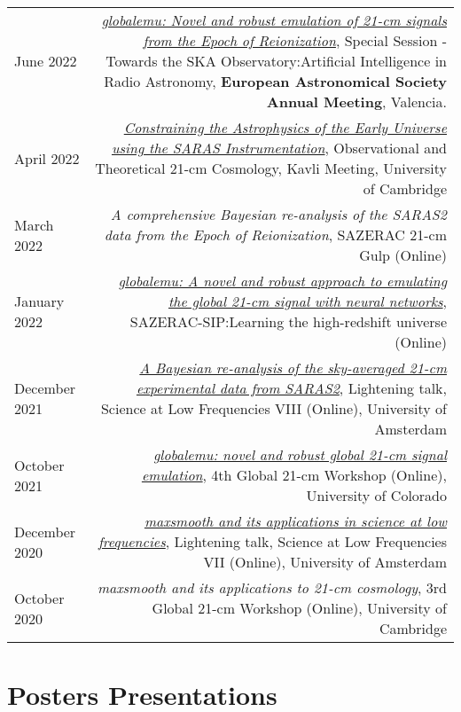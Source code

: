 \documentclass{article}
\begin{document}
\begin{tabular}{L!{\vrule}R}
	June 2022 & \href{https://github.com/htjb/Talks/blob/master/Talks/ESA_globalemu_July_2022/AUDITORIUM\%203A_SS23a_0940_Bevins.pdf}{\textit{globalemu: Novel and robust emulation of 21-cm signals from the Epoch of Reionization}}, Special Session - Towards the SKA Observatory:Artificial Intelligence in Radio Astronomy, \textbf{European Astronomical Society Annual Meeting}, Valencia. \\
	April 2022 & \href{https://www.kicc.cam.ac.uk/events/kavli-science-themed-meetings/observational-and-theoretical-21-cm-cosmology}{\textit{Constraining the Astrophysics of the Early Universe using the SARAS Instrumentation}}, Observational and Theoretical 21-cm Cosmology, Kavli Meeting, University of Cambridge \\
	March 2022 & \textit{A comprehensive Bayesian re-analysis of the SARAS2 data from the Epoch of Reionization}, SAZERAC 21-cm Gulp (Online) \\
	January 2022 & \href{https://www.youtube.com/watch?v=BFwia93NuAc&list=PLp95u5tgS_YUkFaLATBQpLajJzO5ljN5u&index=5}{\textit{globalemu: A novel and robust approach to emulating the global 21-cm signal with neural networks}}, SAZERAC-SIP:Learning the high-redshift universe (Online) \\
	December 2021 & \href{https://www.youtube.com/watch?v=93KCp7rHcGA&list=PLZL7YmXBBHPDCyNfJcWwP78GgacY_Og4E&index=23}{\textit{A Bayesian re-analysis of the sky-averaged 21-cm experimental data from SARAS2}}, Lightening talk, Science at Low Frequencies VIII (Online), University of Amsterdam \\
	October 2021 & \href{https://www.youtube.com/watch?v=862NuVyF33k&list=PLF7c7ri2hrnGlwbn4JLc0PWbncSeARdTP&index=4}{\textit{globalemu: novel and robust global 21-cm signal emulation}}, 4th Global 21-cm Workshop (Online), University of Colorado \\
	December 2020 & \href{https://www.youtube.com/watch?v=Yw6_IInwTNE}{\textit{maxsmooth and its applications in science at low frequencies}}, Lightening talk, Science at Low Frequencies VII (Online), University of Amsterdam \\
	October 2020 & \textit{maxsmooth and its applications to 21-cm cosmology}, 3rd Global 21-cm Workshop (Online), University of Cambridge \\
\end{tabular}


\section*{Posters Presentations}
\end{document}
